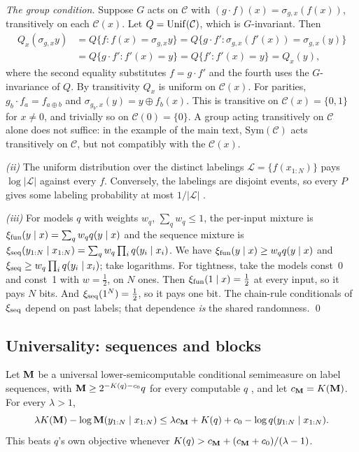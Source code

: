 \emph{The group condition.} Suppose $G$ acts on $\mathcal C$ with $(g\cdot f)(x)=\sigma_{g,x}(f(x))$, transitively on each $\mathcal C(x)$. Let $Q=\mathrm{Unif}(\mathcal C)$, which is $G$-invariant. Then
\begin{align*}
Q_x(\sigma_{g,x}y)&=Q\{f:f(x)=\sigma_{g,x}y\}=Q\{g\cdot f':\sigma_{g,x}(f'(x))=\sigma_{g,x}(y)\}\\
&=Q\{g\cdot f':f'(x)=y\}=Q\{f':f'(x)=y\}=Q_x(y),
\end{align*}
where the second equality substitutes $f=g\cdot f'$ and the fourth uses the $G$-invariance of $Q$. By transitivity $Q_x$ is uniform on $\mathcal C(x)$. For parities, $g_b\cdot f_a=f_{a\oplus b}$ and $\sigma_{g_b,x}(y)=y\oplus f_b(x)$. This is transitive on $\mathcal C(x)=\{0,1\}$ for $x\neq0$, and trivially so on $\mathcal C(0)=\{0\}$. A group acting transitively on $\mathcal C$ alone does not suffice: in the example of the main text, $\mathrm{Sym}(\mathcal C)$ acts transitively on $\mathcal C$, but not compatibly with the $\mathcal C(x)$.

\emph{(ii)} The uniform distribution over the distinct labelings $\mathcal L=\{f(x_{1:N})\}$ pays $\log|\mathcal L|$ against every $f$. Conversely, the labelings are disjoint events, so every $P$ gives some labeling probability at most $1/|\mathcal L|$ \citep{shtarkov1987universal}.

\emph{(iii)} For models $q$ with weights $w_q$, $\sum_qw_q\le1$, the per-input mixture is $\xi_{\rm fun}(y\mid x)=\sum_qw_qq(y\mid x)$ and the sequence mixture is $\xi_{\rm seq}(y_{1:N}\mid x_{1:N})=\sum_qw_q\prod_iq(y_i\mid x_i)$. We have $\xi_{\rm fun}(y\mid x)\ge w_qq(y\mid x)$ and $\xi_{\rm seq}\ge w_q\prod_iq(y_i\mid x_i)$; take logarithms. For tightness, take the models const~0 and const~1 with $w=\frac12$, on $N$ ones. Then $\xi_{\rm fun}(1\mid x)=\frac12$ at every input, so it pays $N$ bits. And $\xi_{\rm seq}(1^N)=\frac12$, so it pays one bit. The chain-rule conditionals of $\xi_{\rm seq}$ depend on past labels; that dependence \emph{is} the shared randomness.
\qed

\subsection{Universality: sequences and blocks}\label{app:simplicity:sequence}

\begin{proposition}\label{prop:simplicity:sequence}
Let $\mathbf M$ be a universal lower-semicomputable conditional semimeasure on label sequences, with $\mathbf M\ge2^{-K(q)-c_0}q$ for every computable $q$ \citep{li2008introduction}, and let $c_{\mathbf M}=K(\mathbf M)$. For every $\lambda>1$,
\[
\lambda K(\mathbf M)-\log\mathbf M(y_{1:N}\mid x_{1:N})\le\lambda c_{\mathbf M}+K(q)+c_0-\log q(y_{1:N}\mid x_{1:N}).
\]
This beats $q$'s own objective whenever $K(q)>c_{\mathbf M}+(c_{\mathbf M}+c_0)/(\lambda-1)$.
\end{proposition}

